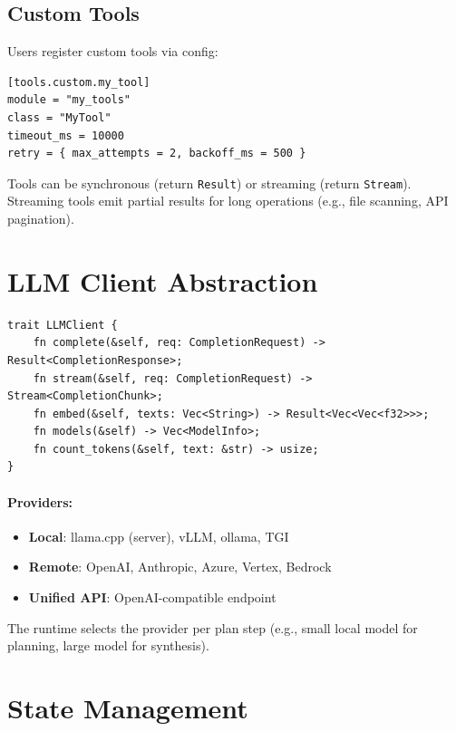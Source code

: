 \subsection{Custom Tools}
\label{sec:runtime:custom-tools}

Users register custom tools via config:

\begin{verbatim}
[tools.custom.my_tool]
module = "my_tools"
class = "MyTool"
timeout_ms = 10000
retry = { max_attempts = 2, backoff_ms = 500 }
\end{verbatim}

Tools can be synchronous (return \texttt{Result}) or streaming (return \texttt{Stream}). Streaming tools emit partial results for long operations (e.g., file scanning, API pagination).

\section{LLM Client Abstraction}
\label{sec:runtime:llm-client}

\begin{verbatim}
trait LLMClient {
    fn complete(&self, req: CompletionRequest) -> Result<CompletionResponse>;
    fn stream(&self, req: CompletionRequest) -> Stream<CompletionChunk>;
    fn embed(&self, texts: Vec<String>) -> Result<Vec<Vec<f32>>>;
    fn models(&self) -> Vec<ModelInfo>;
    fn count_tokens(&self, text: &str) -> usize;
}
\end{verbatim}

\paragraph{Providers:}
\begin{itemize}
  \item \textbf{Local}: llama.cpp (server), vLLM, ollama, TGI
  \item \textbf{Remote}: OpenAI, Anthropic, Azure, Vertex, Bedrock
  \item \textbf{Unified API}: OpenAI-compatible endpoint
\end{itemize}

The runtime selects the provider per plan step (e.g., small local model for planning, large model for synthesis).

\section{State Management}
\label{sec:runtime:state}

